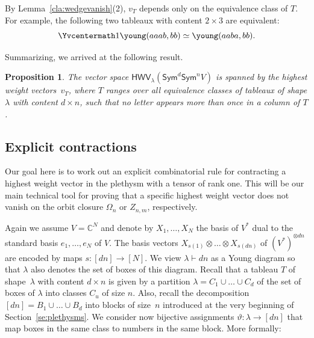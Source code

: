 \documentclass[11pt]{amsart}
\def\C{\mathbb{C}}
\def\Sym{\mathsf{Sym}}
\newcommand{\Det}{\Omega}
\def\la{\lambda}
\def\ot{\otimes}
\newcommand{\out}{d}
\newcommand{\inn}{n}
\newcommand{\HWV}{\mathsf{HWV}}
\numberwithin{equation}{section}
\newtheorem{proposition}[theorem]{Proposition}
\begin{document}
By Lemma~\ref{cla:wedgevanish}(2), $v_T$ depends only on the equivalence class of $T$.
For example, the following two tableaux with content $2\times 3$ are equivalent: 
\[
\Yvcentermath1 \young(aaab,bb) \simeq
 \young(aaba,bb) .
\]

Summarizing, we arrived at the following result.

\begin{proposition}\label{pro:HWVSS-gen}
The vector space $\HWV_\la(\Sym^\out \Sym^\inn V)$ is spanned by the 
highest weight vectors~$v_T$, where $T$ ranges over all equivalence classes of tableaux 
of shape $\la$ with content $\out \times \inn$,  
such that no letter appears more than once in a column of $T$.
\end{proposition}

\subsection{Explicit contractions} %
\label{sec:tensorcontrandfuncteval}


Our goal here is to work out an explicit combinatorial rule for contracting a highest weight vector in the plethysm
with a tensor of rank one. This will be our main technical tool for proving that a specific highest weight vector 
does not vanish on the orbit closure $\Det_n$ or $Z_{n,m}$, respectively.  

Again we assume $V=\C^N$ and denote by 
$X_1, \ldots, X_{N}$ the basis of $V^*$ dual to the standard basis $e_1,\ldots,e_N$ of $V$. 
The basis vectors $X_{s(1)} \ot\ldots\ot X_{s(dn)}$ of $(V^*)^{\ot dn}$ 
are encoded by maps $s\colon [dn] \to [N]$. 
We view $\la\vdash dn$ as a Young diagram %
so that $\la$ also denotes the set of boxes of this diagram.
Recall that a tableau $T$ of shape~$\la$ with content $d\times n$ is 
given by a partition $\la =C_1 \cup\ldots \cup C_d$
of the set of boxes of $\la$ into classes $C_u$ of 
size $n$.
Also, recall the decomposition 
$[dn]=B_1\cup\ldots \cup B_d$ into blocks of size~$n$ 
introduced at the very beginning of Section~\ref{se:plethysms}. 
We consider now bijective assignments $\vartheta\colon\la \to [dn]$ 
that map boxes in the same class to numbers in the same block. 
More formally: 
\end{document}
